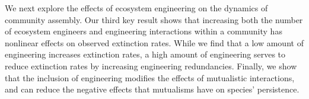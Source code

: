 \documentclass[9pt,twocolumn,twoside]{pnas-new}
\begin{document}
We next explore the effects of ecosystem engineering on the dynamics of community assembly.
Our third key result shows that increasing both the number of ecosystem engineers and engineering interactions within a community has nonlinear effects on observed extinction rates.
While we find that a low amount of engineering increases extinction rates, a high amount of engineering serves to reduce extinction rates by increasing engineering redundancies.
Finally, we show that the inclusion of engineering modifies the effects of mutualistic interactions, and can reduce the negative effects that mutualisms have on species' persistence.\\
\end{document}
